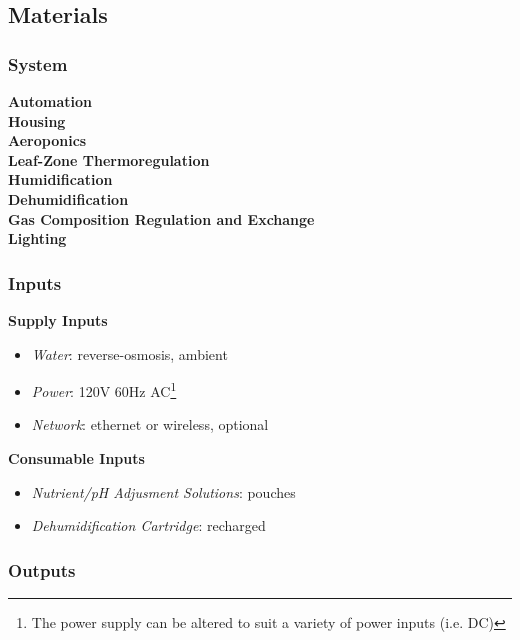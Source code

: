 \subsection{Materials}
\subsubsection{System}

\textbf{Automation}\\


\textbf{Housing}\\


\textbf{Aeroponics}\\


\textbf{Leaf-Zone Thermoregulation}\\


\textbf{Humidification}\\


\textbf{Dehumidification}\\


\textbf{Gas Composition Regulation and Exchange}\\


\textbf{Lighting}\\


\subsubsection{Inputs}

\textbf{Supply Inputs}
\begin{itemize}
  \item \textit{Water}: reverse-osmosis, ambient
  \item \textit{Power}: 120V 60Hz AC\footnote{The power supply can be altered to suit a variety of power inputs (i.e. DC)}
  \item \textit{Network}: ethernet or wireless, optional
\end{itemize}

\textbf{Consumable Inputs}
\begin{itemize}
  \item \textit{Nutrient/pH Adjusment Solutions}: pouches
  \item \textit{Dehumidification Cartridge}: recharged
\end{itemize}

\subsubsection{Outputs}

